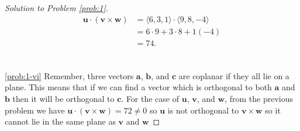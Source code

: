 \documentclass[12pt]{article}
\theoremstyle{plain}
\theoremstyle{definition}
\theoremstyle{remark}
\newcommand{\bfa}{\mathbf{a}}
\newcommand{\bfb}{\mathbf{b}}
\newcommand{\bfc}{\mathbf{c}}
\newcommand{\bfu}{\mathbf{u}}
\newcommand{\bfv}{\mathbf{v}}
\newcommand{\bfw}{\mathbf{w}}
\begin{document}
\begin{proof}[Solution to Problem \ref{prob:1}]
\begin{align*}
\bfu\cdot(\bfv\times\bfw)
&=\langle 6,3,1\rangle\cdot\langle 9,8,-4\rangle\\
&=6\cdot 9+3\cdot 8+1(-4)\\
&=74.
\end{align*}
\\\\
\ref{prob:1-vi} Remember, three vectors $\bfa$, $\bfb$, and $\bfc$ are
coplanar if they all lie on a plane. This means that if we can find a
vector which is orthogonal to both $\bfa$ and $\bfb$ then it will be
orthogonal to $\bfc$. For the case of $\bfu$, $\bfv$, and $\bfw$, from the
previous problem we have $\bfu\cdot(\bfv\times\bfw)=72\neq 0$ so $\bfu$ is
not orthogonal to $\bfv\times\bfw$ so it cannot lie in the same plane as
$\bfv$ and $\bfw$
\end{proof}
\end{document}

